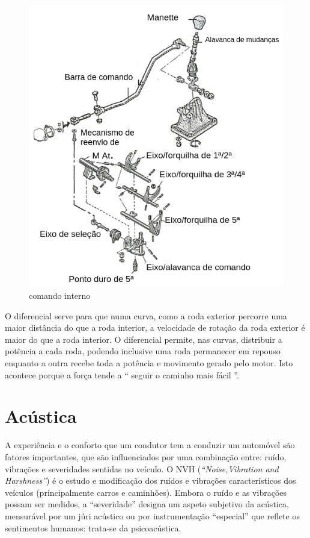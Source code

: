 \begin{figure}[H]
\centering
\includegraphics[scale=0.4]{figs/comando_interno}
\caption{comando interno \cite{formacaoCaixa}}\label{comando interno}
\end{figure}

O diferencial serve para que numa curva, como a roda exterior percorre uma maior distância do que a roda interior, a velocidade de rotação da roda exterior é maior do que a roda interior. O diferencial permite, nas curvas, distribuir a potência a cada roda, podendo inclusive uma roda permanecer em repouso enquanto a outra recebe toda a potência e movimento gerado pelo motor. Isto acontece porque a força tende a “ seguir o caminho mais fácil ”.


\section{Acústica}

A experiência e o conforto que um condutor tem a conduzir um automóvel são fatores importantes, que são influenciados por uma combinação entre: ruído, vibrações e severidades sentidas no veículo. O NVH (\textit{``Noise,Vibration and Harshness''}) é o estudo e modificação dos ruídos e vibrações característicos dos veículos (principalmente carros e caminhões). Embora o ruído e as vibrações possam ser medidos, a ``severidade'' designa um aspeto subjetivo da acústica, mensurável por um júri acústico ou por instrumentação ``especial'' que reflete os sentimentos humanos: trata-se da psicoacústica.

